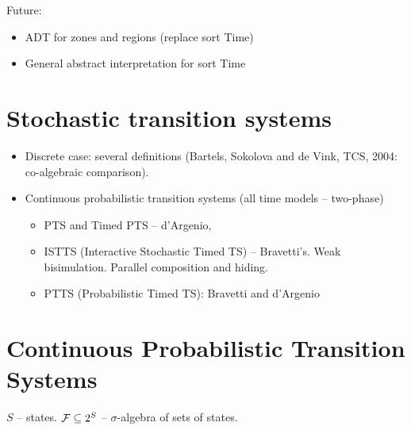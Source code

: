 \begin{slide}
\begin{itemize}
\end{itemize}
\pause
Future:
\begin{itemize}
\item ADT for zones and regions (replace sort Time)
\item General abstract interpretation for sort Time
\end{itemize}
\newslide\section*{Stochastic transition systems}
\begin{itemize}
\item Discrete case: several definitions (Bartels, Sokolova and de Vink, TCS, 2004: co-algebraic comparison).
\pause
\item Continuous probabilistic transition systems (all time models -- two-phase)
  \begin{itemize}
  \item PTS and Timed PTS -- d'Argenio, 
  \item ISTTS (Interactive Stochastic Timed TS) -- Bravetti's. Weak bisimulation. Parallel composition and hiding.
  \item PTTS (Probabilistic Timed TS): Bravetti and d'Argenio
  \end{itemize}
\end{itemize}
\newslide\section*{Continuous Probabilistic Transition Systems}
$S$ -- states. ${\cal F}\subseteq 2^S$ -- $\sigma$-algebra of sets of states. 


\end{slide}
